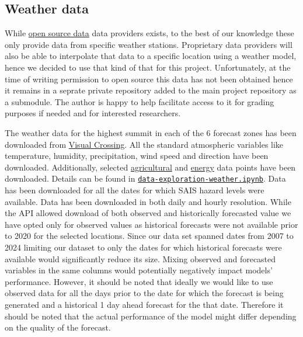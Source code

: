 \documentclass{article}
\begin{document}
\subsection{Weather data}
While \href{https://meteostat.net}{open source data} data providers exists, to the best of our knowledge these only provide data from specific weather stations. Proprietary data providers will also be able to interpolate that data to a specific location using a weather model, hence we decided to use that kind of that for this project. Unfortunately, at the time of writing permission to open source this data has not been obtained hence it remains in a seprate private repository added to the main project repository as a submodule. The author is happy to help facilitate access to it for grading purposes if needed and for interested researchers.

The weather data for the highest summit in each of the 6 forecast zones has been downloaded from \href{https://www.visualcrossing.com/}{Visual Crossing}.  All the standard atmospheric variables like temperature, humidity, precipitation, wind speed and direction have been downloaded. Additionally, selected \href{https://www.visualcrossing.com/resources/documentation/weather-api/agriculture-elements-in-the-timeline-weather-api/}{agricultural} and \href{https://www.visualcrossing.com/resources/documentation/weather-api/energy-elements-in-the-timeline-weather-api/}{energy} data points have been downloaded. Details can be found in \href{https://github.com/witgaw/avalanche-danger-level-forecast/blob/main/src/data-exploration-weather.ipynb}{\texttt{data-exploration-weather.ipynb}}.
	Data has been downloaded for all the dates for which SAIS hazard levels were available. Data has been downloaded in both daily and hourly resolution. 
	While the API allowed download of both observed and historically forecasted value we have opted only for observed values as historical forecasts were not available prior to 2020 for the selected locations. Since our data set spanned dates from 2007 to 2024 limiting our dataset to only the dates for which historical forecasts were available would significantly reduce its size. Mixing observed and forecasted variables in the same columns would potentially negatively impact models' performance. However, it should be noted that ideally we would like to use observed data for all the days prior to the date for which the forecast is being generated and a historical 1 day ahead forecast for the that date. Therefore it should be noted that the actual performance of the model might differ depending on the quality of the forecast.
\end{document}
